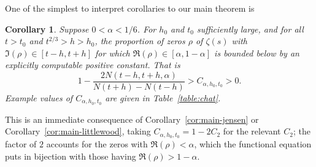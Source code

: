 \documentclass[10pt,english,letter, reqno]{amsart}
\theoremstyle{plain}
\newtheorem{corollary}[theorem]{Corollary}
\theoremstyle{definition}
\begin{document}
One of the simplest to interpret corollaries to our main theorem is
\begin{corollary}\label{cor:simpmain}
Suppose $0<\alpha<1/6$. For $h_0$ and $t_0$ sufficiently large, and for all $t>t_0$ and $t^{2/3}>h>h_0$,
the proportion of zeros $\rho$ of $\zeta(s)$ with $\Im(\rho) \in [t-h,t+h]$ for which $\Re(\rho) \in [\alpha,1-\alpha]$
is bounded below by an explicitly computable positive constant.
That is
\[  1-\frac{2N(t-h,t+h,\alpha)}{N(t+h)-N(t-h)} >  C_{\alpha,h_0,t_0} > 0. \]
Example values of $C_{\alpha,h_0,t_0}$ are given in Table~\ref{table:chat}.
\end{corollary}
This is an immediate consequence of Corollary~\ref{cor:main-jensen} or Corollary~\ref{cor:main-littlewood}, taking $C_{\alpha,h_0,t_0} = 1-2C_2$ for the relevant $C_2$; the factor of $2$ accounts for the zeros with $\Re(\rho)<\alpha$, which the functional equation puts in bijection with those having $\Re(\rho)>1-\alpha$.
\end{document}
